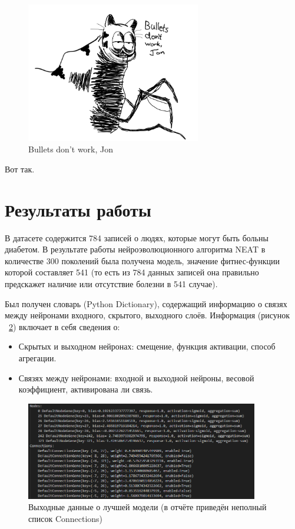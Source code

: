 \documentclass{article}
\begin{document}
\begin{figure}[h]
	\centering
    \includegraphics[width=3in]{jon1}
    \caption{Bullets don't work, Jon}
    \label{fig:Jon}
\end{figure}

Вот так.




\section{Результаты работы}

В датасете содержится 784 записей о людях, которые могут быть больны диабетом. В результате работы нейроэволюционного алгоритма NEAT в количестве 300 поколений была получена модель, значение фитнес-функции которой составляет 541 (то есть из 784 данных записей она правильно предскажет наличие или отсутствие болезни в 541 случае).

Был получен словарь (Python Dictionary), содержащий информацию о связях между нейронами входного, скрытого, выходного слоёв. Информация (рисунок ~\ref{fig:Output3}) включает в себя сведения о:

\begin{itemize}
    \item Скрытых и выходном нейронах: смещение, функция активации, способ агрегации.
    \item Связях между нейронами: входной и выходной нейроны, весовой коэффициент, активирована ли связь.
\end{itemize}

\begin{figure}[h]
	\centering
    \includegraphics[width=4in]{output3}
    \caption{Выходные данные о лучшей модели (в отчёте приведён неполный список Connections)}
    \label{fig:Output3}
\end{figure}
\end{document}
